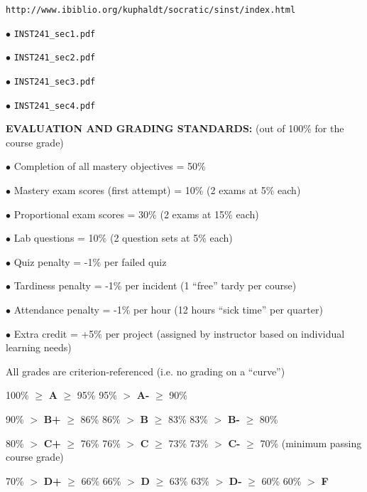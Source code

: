 \noindent
{\tt http://www.ibiblio.org/kuphaldt/socratic/sinst/index.html} 

\vskip 5pt

\item{$\bullet$} {\tt INST241\_sec1.pdf} 
\item{$\bullet$} {\tt INST241\_sec2.pdf} 
\item{$\bullet$} {\tt INST241\_sec3.pdf} 
\item{$\bullet$} {\tt INST241\_sec4.pdf} 


\vfil \eject

\noindent
{\bf EVALUATION AND GRADING STANDARDS:} (out of 100\% for the course grade)

\item{$\bullet$} Completion of all mastery objectives = 50\% 
\item{$\bullet$} Mastery exam scores (first attempt) = 10\% (2 exams at 5\% each)
\item{$\bullet$} Proportional exam scores = 30\% (2 exams at 15\% each)
\item{$\bullet$} Lab questions = 10\% (2 question sets at 5\% each)
\item{$\bullet$} Quiz penalty = -1\% per failed quiz
\item{$\bullet$} Tardiness penalty = -1\% per incident (1 ``free'' tardy per course)
\item{$\bullet$} Attendance penalty = -1\% per hour (12 hours ``sick time'' per quarter)
\item{$\bullet$} Extra credit = +5\% per project (assigned by instructor based on individual learning needs)

\vskip 10pt

\noindent
All grades are criterion-referenced (i.e. no grading on a ``curve'')

\medskip
\item{} 100\% $\geq$ {\bf A} $\geq$ 95\% \hskip 33pt 95\% $>$ {\bf A-} $\geq$ 90\%
\item{} 90\% $>$ {\bf B+} $\geq$ 86\% \hskip 30pt 86\% $>$ {\bf B} $\geq$ 83\% \hskip 30pt 83\% $>$ {\bf B-} $\geq$ 80\%
\item{} 80\% $>$ {\bf C+} $\geq$ 76\% \hskip 30pt 76\% $>$ {\bf C} $\geq$ 73\% \hskip 30pt 73\% $>$ {\bf C-} $\geq$ 70\% (minimum passing course grade)
\item{} 70\% $>$ {\bf D+} $\geq$ 66\% \hskip 30pt 66\% $>$ {\bf D} $\geq$ 63\% \hskip 30pt 63\% $>$ {\bf D-} $\geq$ 60\% \hskip 30pt 60\% $>$ {\bf F}
\medskip

